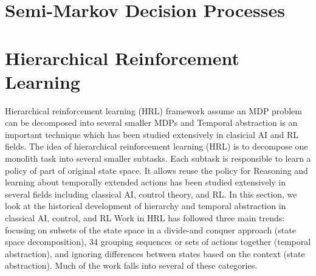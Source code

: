
\section{Semi-Markov Decision Processes}

\section{Hierarchical Reinforcement Learning}

Hierarchical reinforcement learning (HRL) framework assume an MDP problem can be decomposed 
into several smaller MDPs and 
Temporal abstraction is an important technique which has been studied extensively in
clasicial AI and RL fields. The idea of hierarchical reinforcement learning (HRL) 
is to decompose one monolith task into several smaller subtasks. Each subtask is 
responsible to learn a policy of part of original state space. It allows reuse 
the policy for 
Reasoning and learning about temporally extended actions has been studied extensively
in several fields including classical AI, control theory, and RL. In this section, we look at
the historical development of hierarchy and temporal abstraction in classical AI, control,
and RL
Work in HRL has followed three main trends: focusing on
subsets of the state space in a divide-and conquer approach (state space decomposition),
34
grouping sequences or sets of actions together (temporal abstraction), and ignoring differences
between states based on the context (state abstraction). Much of the work falls into
several of these categories.


